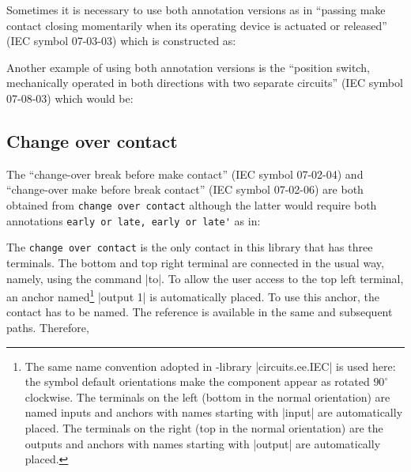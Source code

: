 \documentclass[a4paper]{ltxdoc}
\begin{document}
Sometimes it is necessary to use both annotation versions as in ``passing make contact closing momentarily when its operating device is actuated or released'' (IEC symbol 07-03-03) which is constructed as:
\begin{codeexample}[width=0.7cm]
\end{codeexample}

Another example of using both annotation versions is the ``position switch, mechanically operated in both directions with two separate circuits'' (IEC symbol 07-08-03) which would be:
\begin{codeexample}[width=2.3cm]
\end{codeexample}


\subsection{Change over contact\label{sec:changeover}}
The ``change-over break before make contact'' (IEC symbol 07-02-04) and ``change-over make before break contact'' (IEC symbol 07-02-06) are both obtained from \verb|change over contact| although the latter would require both annotations \verb|early or late, early or late'| as in:
\begin{codeexample}[width=0.8cm]
\end{codeexample}

The \verb|change over contact| is the only contact in this library that has three terminals. The bottom and top right terminal are connected in the usual way, namely, using the command |to|. To allow the user access to the top left terminal, an anchor named\footnote{The same name convention adopted in \tikzname-library |circuits.ee.IEC| is used here: the symbol default orientations make the component appear as rotated $90^{\circ}$ clockwise. The terminals on the left (bottom in the normal orientation) are named inputs and anchors with names starting with |input| are automatically placed. The terminals on the right (top in the normal orientation) are the outputs and anchors with names starting with |output| are automatically placed.} |output 1| is automatically placed. To use this anchor, the contact has to be named. The reference is available in the same and subsequent paths. Therefore, 
\end{document}

